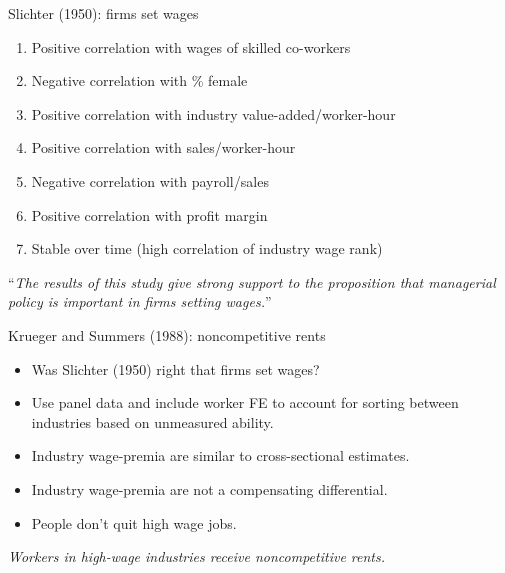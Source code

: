 \documentclass[notes=show]{beamer}
\begin{document}
\begin{frame}{Slichter (1950): firms set wages}
\begin{enumerate}
    \item Positive correlation with wages of skilled co-workers
    \item Negative correlation with \% female
    \item Positive correlation with industry value-added/worker-hour
    \item Positive correlation with sales/worker-hour
    \item Negative correlation with payroll/sales
    \item Positive correlation with profit margin
    \item Stable over time (high correlation of industry wage rank)
\end{enumerate}
\begin{center}
    ``\textit{The results of this study give strong support to the proposition that managerial policy is important in firms setting wages.}''
\end{center}
\end{frame}

\begin{frame}{Krueger and Summers (1988): noncompetitive rents}
\begin{itemize}
    \item Was Slichter (1950) right that firms set wages? \medskip
    \item Use panel data and include worker FE to account for sorting between industries based on unmeasured ability. \medskip
    \item Industry wage-premia are similar to cross-sectional estimates. \medskip
    \item Industry wage-premia are not a compensating differential. \medskip
    \item People don't quit high wage jobs.
\end{itemize}
\begin{center}
    \textit{Workers in high-wage industries receive noncompetitive rents.}
\end{center}
\end{frame}
\end{document}
